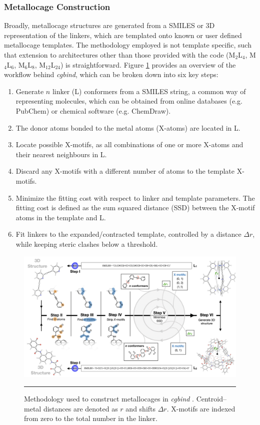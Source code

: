 \documentclass[../../main.tex]{subfiles}
\newcommand{\cgbind}{\emph{cgbind }}
\begin{document}
\subsubsection{Metallocage Construction}
 Broadly, metallocage structures are generated from a SMILES or 3D representation of the linkers, which are templated onto known or user defined metallocage templates. The methodology employed is not template specific, such that extension to architectures other than those provided with the code (M$_2$L$_4$, M$_4$L$_6$, M$_6$L$_8$, M$_{12}$L$_{24}$) is straightforward. Figure \ref{fig::cg_2} provides an overview of the workflow behind \emph{cgbind}, which can be broken down into six key steps: 

\begin{enumerate}[label=\Roman*.$\quad$]
	\item        Generate $n$ linker (L) conformers from a SMILES string, a common way of representing molecules, which can be obtained from online databases (e.g. PubChem) or chemical software (e.g. ChemDraw\texttrademark).
	\item	The donor atoms bonded to the metal atoms (X-atoms) are located in L. 
	\item		Locate possible X-motifs, as all combinations of one or more X-atoms and their nearest neighbours in L.
	\item		Discard any X-motifs with a different number of atoms to the template X-motifs.
	\item	Minimize the fitting cost with respect to linker and template parameters. The fitting cost is defined as the sum squared distance (SSD) between the X-motif atoms in the template and L.
	\item		Fit linkers to the expanded/contracted template, controlled by a distance $\Delta r$, while keeping steric clashes below a threshold. 
\end{enumerate}


\begin{figure}[h!]
	\vspace{0.4cm}
	\centering
	\includegraphics[width=\textwidth]{3/cgbind/figs/fig2}
	\vspace{0.2cm}
	\hrule
	\caption{Methodology used to construct metallocages in \cgbind. Centroid–metal distances are denoted as $r$ and shifts $\Delta r$. X-motifs are indexed from zero to the total number in the linker.}
	\label{fig::cg_2}
\end{figure}
\end{document}
